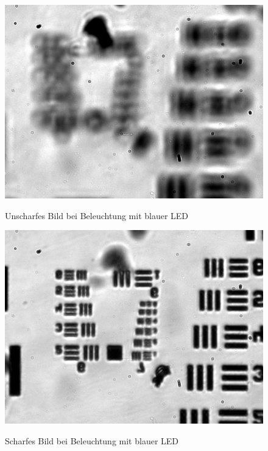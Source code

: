 \documentclass[ngerman]{scrartcl}
\begin{document}
\begin{figure}[H]
    \centering
    \begin{minipage}[t]{0.475\linewidth}
        \centering
        \includegraphics[width=\linewidth]{fig/Versuch3/hellfeld_3.3_blau_unscharf.jpg}
        \caption[Hellfeld LED blau unscharf]{Unscharfes Bild bei Beleuchtung mit blauer LED}
        \label{fig:Hellfeld_3_3_blau_unscharf}
        \includegraphics[width=\linewidth]{fig/Versuch3/hellfeld_3.3_blau_scharf.jpg}
        \caption[Hellfeld LED blau scharf]{Scharfes Bild bei Beleuchtung mit blauer LED}
        \label{fig:Hellfeld_3_3_blau_scharf}
    \end{minipage}%
    \hspace*{\fill}

\end{figure}
\end{document}
